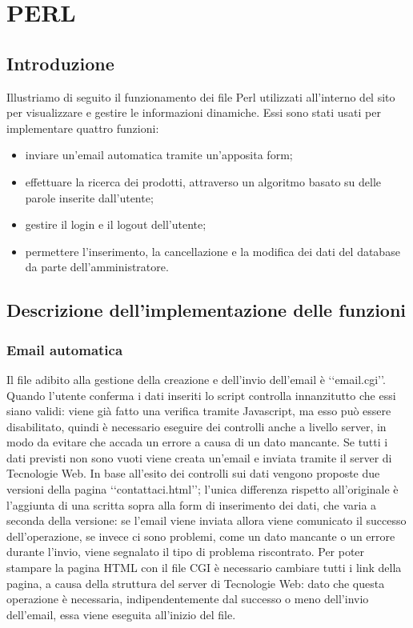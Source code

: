 \section{PERL}{
	\subsection{Introduzione}{
			Illustriamo di seguito il funzionamento dei file Perl utilizzati all'interno del sito per visualizzare e gestire le informazioni dinamiche. Essi sono stati usati per implementare quattro funzioni:
			\begin{itemize}
				\item inviare un'email automatica tramite un'apposita form;
				\item effettuare la ricerca dei prodotti, attraverso un algoritmo basato su delle parole inserite dall'utente;
				\item gestire il login e il logout dell'utente;
				\item permettere l'inserimento, la cancellazione e la modifica dei dati del database da parte dell'amministratore.
			\end{itemize}
	}
	\subsection{Descrizione dell'implementazione delle funzioni}{
		\subsubsection{Email automatica}
			Il file adibito alla gestione della creazione e dell'invio dell'email è ‘‘email.cgi’’. Quando l'utente conferma i dati inseriti lo script controlla innanzitutto che essi siano validi: viene già fatto una verifica tramite Javascript, ma esso può essere disabilitato, quindi è necessario eseguire dei controlli anche a livello server, in modo da evitare che accada un errore a causa di un dato mancante. Se tutti i dati previsti non sono vuoti viene creata un'email e inviata tramite il server di Tecnologie Web.
			In base all'esito dei controlli sui dati vengono proposte due versioni della pagina ‘‘contattaci.html’’; l'unica differenza rispetto all'originale è l'aggiunta di una scritta sopra alla form di inserimento dei dati, che varia a seconda della versione: se l'email viene inviata allora viene comunicato il successo dell'operazione, se invece ci sono problemi, come un dato mancante o un errore durante l'invio, viene segnalato il tipo di problema riscontrato. Per poter stampare la pagina HTML con il file CGI è necessario cambiare tutti i link della pagina, a causa della struttura del server di Tecnologie Web: dato che questa operazione è necessaria, indipendentemente dal successo o meno dell'invio dell'email, essa viene eseguita all'inizio del file.
}}
